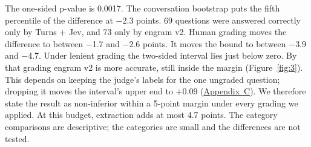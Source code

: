 \documentclass[11pt]{article}
\newcommand{\src}[1]{}
\begin{document}
The one-sided p-value is 0.0017\src{bench/results/v3/batch\_b\_report.json\#H1/p\_one\_sided}. The conversation bootstrap puts the fifth percentile of the difference at $-$2.3\src{bench/results/v3/batch\_b\_report.json\#H1/bootstrap\_conversations\_5th\_percentile} points. 69\src{bench/results/v3/batch\_b\_report.json\#H1/only\_a} questions were answered correctly only by Turns + Jev, and 73\src{bench/results/v3/batch\_b\_report.json\#H1/only\_b} only by engram v2. Human grading moves the difference to between $-$1.7\src{bench/results/v3/human\_audit/audit\_report.json\#strict/H1\_with\_human\_grades/d\_bar} and $-$2.6\src{bench/results/v3/human\_audit/audit\_report.json\#lenient/H1\_with\_human\_grades/d\_bar} points. It moves the bound to between $-$3.9\src{bench/results/v3/human\_audit/audit\_report.json\#strict/H1\_with\_human\_grades/lower\_bound\_95\_one\_sided} and $-$4.7\src{bench/results/v3/human\_audit/audit\_report.json\#lenient/H1\_with\_human\_grades/lower\_bound\_95\_one\_sided}. Under lenient grading the two-sided interval lies just below zero. By that grading engram v2 is more accurate, still inside the margin (Figure~\ref{fig:3}). This depends on keeping the judge's labels for the one ungraded question; dropping it moves the interval's upper end to +0.09\src{bench/results/v3/human\_audit/audit\_report.json\#lenient/H1\_with\_human\_grades\_ungraded\_dropped/ci95\_two\_sided/1} (\hyperref[app:C]{Appendix~C}). We therefore state the result as non-inferior within a 5\src{docs/V3\_PLAN.md §1, §2, §4}-point margin under every grading we applied. At this budget, extraction adds at most 4.7\src{bench/results/v3/human\_audit/audit\_report.json\#lenient/H1\_with\_human\_grades/lower\_bound\_95\_one\_sided (negated)} points. The category comparisons are descriptive; the categories are small and the differences are not tested.
\end{document}
